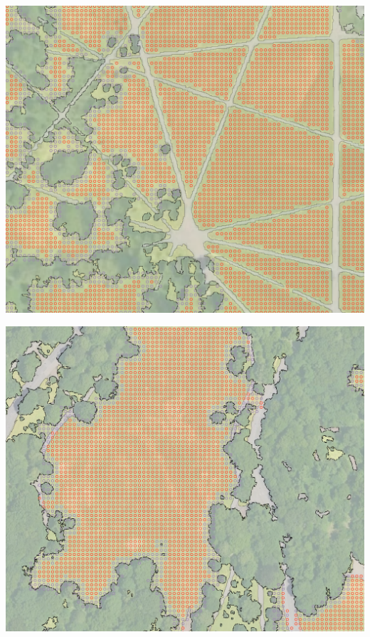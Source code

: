 \begin{multicols}{2}
\begin{minipage}{0.45\textwidth}
    \centering
    \includegraphics[width=\linewidth]{images/gatherings/hyde_circles_1000.png}\par\hspace{3pt} 
    \includegraphics[width=\linewidth]{images/gatherings/prospect_circles_1000.png}\par\hspace{3pt}

\end{minipage}
\end{multicols}
